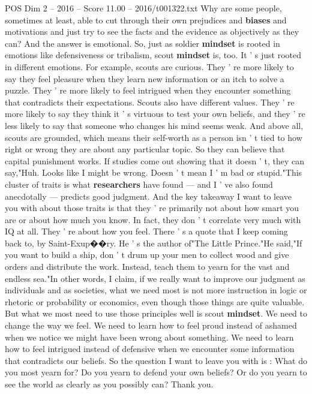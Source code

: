 \begin{textsample}{POS Dim 2 – 2016 – Score 11.00 – 2016/t001322.txt}
Why are some people, sometimes at least, able to cut through their own prejudices and \textbf{biases} and motivations and just try to see the facts and the evidence as objectively as they can?
And the answer is emotional.
So, just as soldier \textbf{mindset} is rooted in emotions like defensiveness or tribalism, scout \textbf{mindset} is, too.
It ' s just rooted in different emotions.
For example, scouts are curious.
They ' re more likely to say they feel pleasure when they learn new information or an itch to solve a puzzle.
They ' re more likely to feel intrigued when they encounter something that contradicts their expectations.
Scouts also have different values.
They ' re more likely to say they think it ' s virtuous to test your own beliefs, and they ' re less likely to say that someone who changes his mind seems weak.
And above all, scouts are grounded, which means their self-worth as a person isn ' t tied to how right or wrong they are about any particular topic.
So they can believe that capital punishment works.
If studies come out showing that it doesn ' t, they can say,"Huh.
Looks like I might be wrong.
Doesn ' t mean I ' m bad or stupid."This cluster of traits is what \textbf{researchers} have found — and I ' ve also found anecdotally — predicts good judgment.
And the key takeaway I want to leave you with about those traits is that they ' re primarily not about how smart you are or about how much you know.
In fact, they don ' t correlate very much with IQ at all.
They ' re about how you feel.
There ' s a quote that I keep coming back to, by Saint-Exup{\EmojiFont �}{\EmojiFont �}ry.
He ' s the author of"The Little Prince."He said,"If you want to build a ship, don ' t drum up your men to collect wood and give orders and distribute the work.
Instead, teach them to yearn for the vast and endless sea."In other words, I claim, if we really want to improve our judgment as individuals and as societies, what we need most is not more instruction in logic or rhetoric or probability or economics, even though those things are quite valuable.
But what we most need to use those principles well is scout \textbf{mindset}.
We need to change the way we feel.
We need to learn how to feel proud instead of ashamed when we notice we might have been wrong about something.
We need to learn how to feel intrigued instead of defensive when we encounter some information that contradicts our beliefs.
So the question I want to leave you with is : What do you most yearn for?
Do you yearn to defend your own beliefs?
Or do you yearn to see the world as clearly as you possibly can?
Thank you.

\end{textsample}
